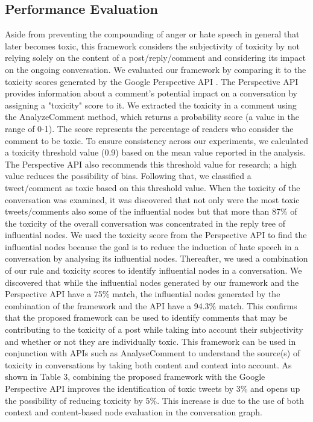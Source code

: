 \documentclass[acmtog]{acmart}
\begin{document}
\subsection{Performance Evaluation}
Aside from preventing the compounding of anger or hate speech in general that later becomes toxic, this framework considers the subjectivity of toxicity by not relying solely on the content of a post/reply/comment and considering its impact on the ongoing conversation. We evaluated our framework by comparing it to the toxicity scores generated by the Google Perspective API \cite{bworld}. The Perspective API provides information about a comment's potential impact on a conversation by assigning a "toxicity" score to it. We extracted the toxicity in a comment using the AnalyzeComment \cite{bworld} method, which returns a probability score (a value in the range of 0-1). The score represents the percentage of readers who consider the comment to be toxic. To ensure consistency across our experiments, we calculated a toxicity threshold value (0.9) based on the mean value reported in the analysis. The Perspective API \cite{bworld} also recommends this threshold value for research; a high value reduces the possibility of bias. Following that, we classified a tweet/comment as toxic based on this threshold value. When the toxicity of the conversation was examined, it was discovered that not only were the most toxic tweets/comments also some of the influential nodes but that more than 87\% of the toxicity of the overall conversation was concentrated in the reply tree of influential nodes. We used the toxicity score from the Perspective API \cite{bworld} to find the influential nodes because the goal is to reduce the induction of hate speech in a conversation by analysing its influential nodes. Thereafter, we used a combination of our rule and toxicity scores to identify influential nodes in a conversation. We discovered that while the influential nodes generated by our framework and the Perspective API have a 75\% match, the influential nodes generated by the combination of the framework and the API have a 94.3\% match. This confirms that the proposed framework can be used to identify comments that may be contributing to the toxicity of a post while taking into account their subjectivity and whether or not they are individually toxic. This framework can be used in conjunction with APIs such as AnalyseComment to understand the source(s) of toxicity in conversations by taking both content and context into account. As shown in Table 3, combining the proposed framework with the Google Perspective API improves the identification of toxic tweets by 3\% and opens up the possibility of reducing toxicity by 5\%. This increase is due to the use of both context and content-based node evaluation in the conversation graph.
\end{document}

